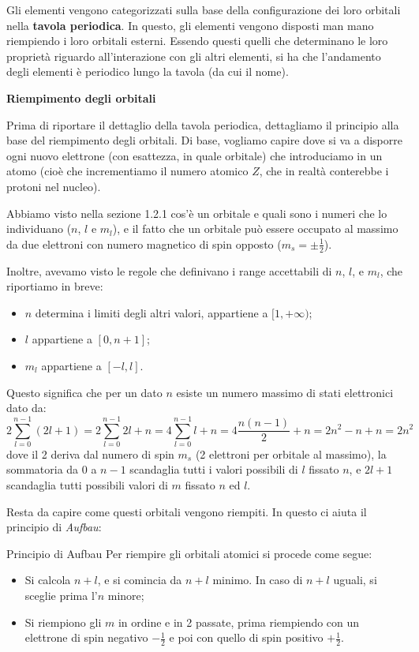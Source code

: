 \documentclass[a4paper,11pt]{article}
\begin{document}
Gli elementi vengono categorizzati sulla base della configurazione dei loro orbitali nella \textbf{tavola periodica}.
In questo, gli elementi vengono disposti man mano riempiendo i loro orbitali esterni. Essendo questi quelli che determinano le loro proprietà riguardo all'interazione con gli altri elementi, si ha che l'andamento degli elementi è periodico lungo la tavola (da cui il nome).

\par\smallskip

\noindent
\textbf{\textsf{Riempimento degli orbitali}}

\noindent
Prima di riportare il dettaglio della tavola periodica, dettagliamo il principio alla base del riempimento degli orbitali. Di base, vogliamo capire dove si va a disporre ogni nuovo elettrone (con esattezza, in quale orbitale) che introduciamo in un atomo (cioè che incrementiamo il numero atomico $Z$, che in realtà conterebbe i protoni nel nucleo).

Abbiamo visto nella sezione 1.2.1 cos'è un orbitale e quali sono i numeri che lo individuano ($n$, $l$ e $m_l$), e il fatto che un orbitale può essere occupato al massimo da due elettroni con numero magnetico di spin opposto ($m_s = \pm \frac{1}{2}$).

Inoltre, avevamo visto le regole che definivano i range accettabili di $n$, $l$, e $m_l$, che riportiamo in breve:
\begin{itemize}
	\item $n$ determina i limiti degli altri valori, appartiene a $[1, +\infty)$;
	\item $l$ appartiene a $[0, n + 1]$;
	\item $m_l$ appartiene a $[-l, l]$.
\end{itemize}
Questo significa che per un dato $n$ esiste un numero massimo di stati elettronici dato da:
$$
2 \sum_{l = 0}^{n - 1} (2l + 1) = 2 \sum_{l = 0}^{n - 1} 2l + n = 4 \sum_{l = 0}^{n - 1} l + n = 4 \frac{n(n - 1)}{2} + n = 2 n^2 - n + n = 2 n^2
$$
dove il 2 deriva dal numero di spin $m_s$ (2 elettroni per orbitale al massimo), la sommatoria da $0$ a $n - 1$ scandaglia tutti i valori possibili di $l$ fissato $n$, e $2l + 1$ scandaglia tutti possibili valori di $m$ fissato $n$ ed $l$.

Resta da capire come questi orbitali vengono riempiti. In questo ci aiuta il principio di \textit{Aufbau}:
\begin{definition}{Principio di Aufbau}
	Per riempire gli orbitali atomici si procede come segue:
	\begin{itemize}
		\item Si calcola $n + l$, e si comincia da $n + l$ minimo. In caso di $n + l$ uguali, si sceglie prima l'$n$ minore;
		\item Si riempiono gli $m$ in ordine e in 2 passate, prima riempiendo con un elettrone di spin negativo $-\frac{1}{2}$ e poi con quello di spin positivo $+\frac{1}{2}$.
	\end{itemize}
\end{definition}
\end{document}
